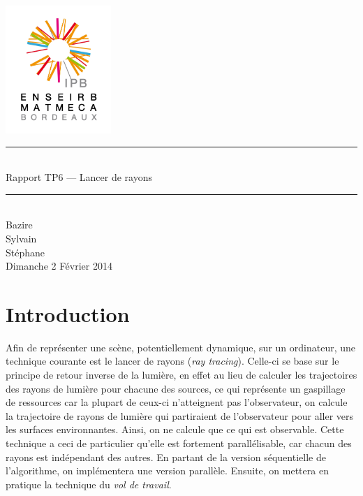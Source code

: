 \documentclass[a4paper,11pt]{article}
\begin{document}
\begin{titlepage}
  \begin{center}

    \begin{center}
      \includegraphics[width=4cm]{EM.jpg}
    \end{center}

    \vspace*{1cm}
        
    \rule{0.75\linewidth}{0.7mm}\\[0.4cm]
    {\Huge Rapport TP6 --- Lancer de rayons\\[0.4cm]}
    \rule{0.75\linewidth}{0.7mm} \\[1.5cm]

    {\Large Bazire \\Sylvain {}\\Stéphane \\[2cm]}
    {\Large Dimanche 2 Février 2014}
  \end{center}
\end{titlepage}

\tableofcontents
\clearpage
\section{Introduction}

Afin de représenter une scène, potentiellement dynamique, sur un ordinateur, une technique courante est le lancer de rayons (\emph{ray tracing}). Celle-ci se base sur le principe de retour inverse de la lumière, en effet au lieu de calculer les trajectoires des rayons de lumière pour chacune des sources, ce qui représente un gaspillage de ressources car la plupart de ceux-ci n'atteignent pas l'observateur, on calcule la trajectoire de rayons de lumière qui partiraient de l'observateur pour aller vers les surfaces environnantes. Ainsi, on ne calcule que ce qui est observable. Cette technique a ceci de particulier qu'elle est fortement parallélisable, car chacun des rayons est indépendant des autres. En partant de la version séquentielle de l'algorithme, on implémentera une version parallèle. Ensuite, on mettera en pratique la technique du \emph{vol de travail}.
\end{document}
